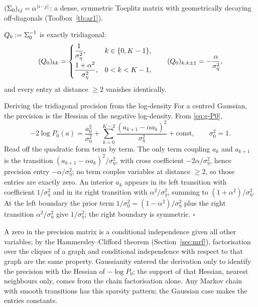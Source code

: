 \begin{proposition}\label{prop:g-Sigma0}
$(\Sigma_0)_{ij} = \alpha^{|i-j|}$: a dense, symmetric Toeplitz matrix with
geometrically decaying off-diagonals (Toolbox~\ref{tb:ar1}).
\end{proposition}

\begin{proposition}\label{prop:g-Q0}
$Q_0 := \Sigma_0^{-1}$ is exactly tridiagonal:
\begin{equation}
  (Q_0)_{kk} =
  \begin{cases}
    \dfrac{1}{\sigma_\eta^2}, & k \in \{0, K-1\},\\[8pt]
    \dfrac{1+\alpha^2}{\sigma_\eta^2}, & 0 < k < K-1,
  \end{cases}
  \qquad
  (Q_0)_{k, k\pm 1} = -\frac{\alpha}{\sigma_\eta^2},
  \label{eq:g-Q0}
\end{equation}
and every entry at distance $\geq 2$ vanishes identically.
\end{proposition}

\begin{toolbox}{Deriving the tridiagonal precision from the log-density}
For a centred Gaussian, the precision is the Hessian of the negative
log-density. From \eqref{eq:g-P0},
\begin{equation*}
  -2 \log P_0(a)
  = \frac{a_0^2}{\sigma_0^2}
  + \sum_{k=0}^{K-2} \frac{(a_{k+1} - \alpha a_k)^2}{\sigma_\eta^2}
  + \text{const},
  \qquad \sigma_0^2 = 1 .
\end{equation*}
Read off the quadratic form term by term. The only term coupling $a_k$ and
$a_{k+1}$ is the transition $(a_{k+1} - \alpha a_k)^2/\sigma_\eta^2$, with
cross coefficient $-2\alpha/\sigma_\eta^2$, hence precision entry
$-\alpha/\sigma_\eta^2$; no term couples variables at distance $\geq 2$,
so those entries are exactly zero. An interior $a_k$ appears in its left
transition with coefficient $1/\sigma_\eta^2$ and in its right transition
with $\alpha^2/\sigma_\eta^2$, summing to $(1+\alpha^2)/\sigma_\eta^2$. At
the left boundary the prior term $1/\sigma_0^2 = (1-\alpha^2)/\sigma_\eta^2$
plus the right transition $\alpha^2/\sigma_\eta^2$ give $1/\sigma_\eta^2$;
the right boundary is symmetric. \hfill$\square$
\end{toolbox}

\begin{remark}
\label{rmk:g-markov-sparsity}
A zero in the precision matrix is a conditional independence given all
other variables; by the Hammersley--Clifford theorem
(Section~\ref{sec:mrf}), factorisation over the cliques of a graph and
conditional independence with respect to that graph are the same property.
Gaussianity entered the derivation only to identify the precision with the
Hessian of $-\log P_0$; the support of that Hessian, nearest neighbours
only, comes from the chain factorisation alone. Any Markov chain with
smooth transitions has this sparsity pattern; the Gaussian case makes the
entries constants.
\end{remark}


